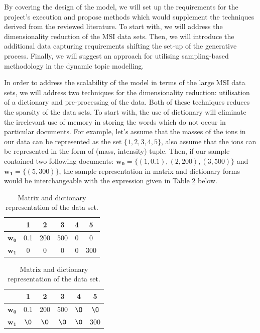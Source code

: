 \documentclass{mprop}
\begin{document}
\par By covering the design of the model, we will set up the requirements for the project's execution and propose methods which would supplement the techniques derived from the reviewed literature. To start with, we will address the dimensionality reduction of the MSI data sets. Then, we will introduce the additional data capturing requirements shifting the set-up of the generative process. Finally, we will suggest an approach for utilising sampling-based methodology in the dynamic topic modelling. 

\par In order to address the scalability of the model in terms of the large MSI data sets, we will address two techniques for the dimensionality reduction: utilisation of a dictionary and pre-processing of the data. Both of these techniques reduces the sparsity of the data sets. To start with, the use of dictionary will eliminate the irrelevant use of memory in storing the words which do not occur in particular documents. For example, let's assume that the masses of the ions in our data can be represented as the set $\{1, 2, 3, 4, 5\}$, also assume that the ions can be represented in the form of (mass, intensity) tuple. Then, if our sample contained two following documents: $\mathbf{w_0} = \{(1, 0.1), (2, 200), (3, 500)\}$ and $\mathbf{w_1} = \{(5, 300)\}$, the sample representation in matrix and dictionary forms would be interchangeable with the expression given in Table \ref{tab:m_and_d} below.
\begin{table}[H]
\begin{center}
\begin{tabular}{|c||c|c|c|c|c|}
\hline
&1&2&3&4&5\\
\hline
$\mathbf{w_0}$&0.1&200&500&0&0\\
$\mathbf{w_1}$&0&0&0&0&300\\
\hline
\end{tabular}
\quad
\begin{tabular}{|c||c|c|c|c|c|}
\hline
&1&2&3&4&5\\
\hline
$\mathbf{w_0}$&0.1&200&500&$\O$&$\O$\\
$\mathbf{w_1}$&$\O$&$\O$&$\O$&$\O$&300\\
\hline
\end{tabular}
\end{center}
\caption{Matrix and dictionary representation of the data set.}
\label{tab:m_and_d}
\end{table}
\end{document}
